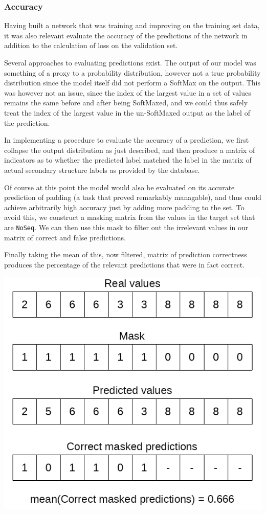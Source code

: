 \begin{multicols}{2}
\subsubsection{Accuracy}
Having built a network that was training and improving on the training set data, it was also relevant evaluate the accuracy of the predictions of the network in addition to the calculation of loss on the validation set.

Several approaches to evaluating predictions exist. The output of our model was something of a proxy to a probability distribution, however not a true probability distribution since the model itself did not perform a SoftMax on the output. This was however not an issue, since the index of the largest value in a set of values remains the same before and after being SoftMaxed, and we could thus safely treat the index of the largest value in the un-SoftMaxed output as the label of the prediction.

In implementing a procedure to evaluate the accuracy of a prediction, we first collapse the output distribution as just described, and then produce a matrix of indicators as to whether the predicted label matched the label in the matrix of actual secondary structure labels as provided by the database.

Of course at this point the model would also be evaluated on its accurate prediction of padding (a task that proved remarkably managable), and thus could achieve arbitrarily high accuracy just by adding more padding to the set. To avoid this, we construct a masking matrix from the values in the target set that are \texttt{NoSeq}. We can then use this mask to filter out the irrelevant values in our matrix of correct and false predictions.

Finally taking the mean of this, now filtered, matrix of prediction correctness produces the percentage of the relevant predictions that were in fact correct.
\begin{Figure}
 \centering
 \includegraphics[width=0.8\linewidth]{../graphs/accuracy}
 \captionsetup{width=0.8\linewidth, font=small}
\end{Figure}


\end{multicols}
